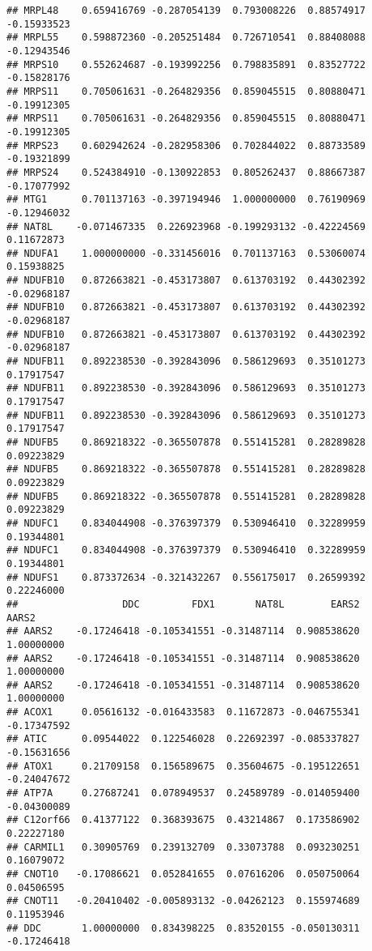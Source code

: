 \documentclass[
]{article}
\begin{document}
\begin{verbatim}
## MRPL48    0.659416769 -0.287054139  0.793008226  0.88574917 -0.15933523
## MRPL55    0.598872360 -0.205251484  0.726710541  0.88408088 -0.12943546
## MRPS10    0.552624687 -0.193992256  0.798835891  0.83527722 -0.15828176
## MRPS11    0.705061631 -0.264829356  0.859045515  0.80880471 -0.19912305
## MRPS11    0.705061631 -0.264829356  0.859045515  0.80880471 -0.19912305
## MRPS23    0.602942624 -0.282958306  0.702844022  0.88733589 -0.19321899
## MRPS24    0.524384910 -0.130922853  0.805262437  0.88667387 -0.17077992
## MTG1      0.701137163 -0.397194946  1.000000000  0.76190969 -0.12946032
## NAT8L    -0.071467335  0.226923968 -0.199293132 -0.42224569  0.11672873
## NDUFA1    1.000000000 -0.331456016  0.701137163  0.53060074  0.15938825
## NDUFB10   0.872663821 -0.453173807  0.613703192  0.44302392 -0.02968187
## NDUFB10   0.872663821 -0.453173807  0.613703192  0.44302392 -0.02968187
## NDUFB10   0.872663821 -0.453173807  0.613703192  0.44302392 -0.02968187
## NDUFB11   0.892238530 -0.392843096  0.586129693  0.35101273  0.17917547
## NDUFB11   0.892238530 -0.392843096  0.586129693  0.35101273  0.17917547
## NDUFB11   0.892238530 -0.392843096  0.586129693  0.35101273  0.17917547
## NDUFB5    0.869218322 -0.365507878  0.551415281  0.28289828  0.09223829
## NDUFB5    0.869218322 -0.365507878  0.551415281  0.28289828  0.09223829
## NDUFB5    0.869218322 -0.365507878  0.551415281  0.28289828  0.09223829
## NDUFC1    0.834044908 -0.376397379  0.530946410  0.32289959  0.19344801
## NDUFC1    0.834044908 -0.376397379  0.530946410  0.32289959  0.19344801
## NDUFS1    0.873372634 -0.321432267  0.556175017  0.26599392  0.22246000
##                  DDC         FDX1       NAT8L        EARS2       AARS2
## AARS2    -0.17246418 -0.105341551 -0.31487114  0.908538620  1.00000000
## AARS2    -0.17246418 -0.105341551 -0.31487114  0.908538620  1.00000000
## AARS2    -0.17246418 -0.105341551 -0.31487114  0.908538620  1.00000000
## ACOX1     0.05616132 -0.016433583  0.11672873 -0.046755341 -0.17347592
## ATIC      0.09544022  0.122546028  0.22692397 -0.085337827 -0.15631656
## ATOX1     0.21709158  0.156589675  0.35604675 -0.195122651 -0.24047672
## ATP7A     0.27687241  0.078949537  0.24589789 -0.014059400 -0.04300089
## C12orf66  0.41377122  0.368393675  0.43214867  0.173586902  0.22227180
## CARMIL1   0.30905769  0.239132709  0.33073788  0.093230251  0.16079072
## CNOT10   -0.17086621  0.052841655  0.07616206  0.050750064  0.04506595
## CNOT11   -0.20410402 -0.005893132 -0.04262123  0.155974689  0.11953946
## DDC       1.00000000  0.834398225  0.83520155 -0.050130311 -0.17246418

\end{verbatim}
\end{document}
